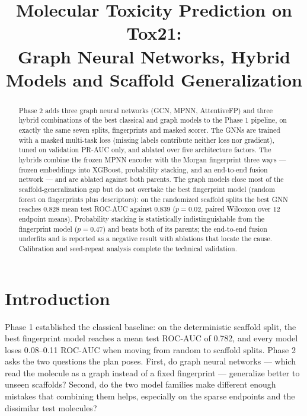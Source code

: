 \documentclass[conference]{IEEEtran}
\begin{document}
\title{Molecular Toxicity Prediction on Tox21:\\Graph Neural Networks, Hybrid Models and Scaffold Generalization}

\author{
}

\maketitle

\begin{abstract}
Phase 2 adds three graph neural networks (GCN, MPNN, AttentiveFP) and three hybrid
combinations of the best classical and graph models to the Phase 1 pipeline, on exactly the
same seven splits, fingerprints and masked scorer. The GNNs are trained with a masked
multi-task loss (missing labels contribute neither loss nor gradient), tuned on validation
PR-AUC only, and ablated over five architecture factors. The hybrids combine the frozen MPNN
encoder with the Morgan fingerprint three ways --- frozen embeddings into XGBoost,
probability stacking, and an end-to-end fusion network --- and are ablated against both
parents. The graph models close most of the scaffold-generalization gap but do not overtake
the best fingerprint model (random forest on fingerprints plus descriptors): on the
randomized scaffold splits the best GNN reaches 0.828 mean test ROC-AUC against 0.839
($p=0.02$, paired Wilcoxon over 12 endpoint means). Probability stacking is statistically
indistinguishable from the fingerprint model ($p=0.47$) and beats both of its parents; the
end-to-end fusion underfits and is reported as a negative result with ablations that locate
the cause. Calibration and seed-repeat analysis complete the technical validation.
\end{abstract}

\section{Introduction}
Phase 1 established the classical baseline: on the deterministic scaffold split, the best
fingerprint model reaches a mean test ROC-AUC of 0.782, and every model loses 0.08--0.11
ROC-AUC when moving from random to scaffold splits. Phase 2 asks the two questions the
plan poses. First, do graph neural networks --- which read the molecule as a graph instead
of a fixed fingerprint --- generalize better to unseen scaffolds? Second, do the two model
families make different enough mistakes that combining them helps, especially on the
sparse endpoints and the dissimilar test molecules?
\end{document}
